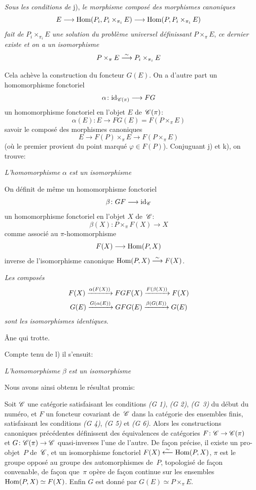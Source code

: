 \begin{enumerateb}
\item[k)] \emph{Sous les conditions de} j), \emph{le morphisme
composé des morphismes canoniques}
$$
E \to \Hom(P_i,P_i \times_{\pi_i} E) \to \Hom(P,P_i \times_{\pi_i} E)
$$
\emph{fait de} $P_i \times_{\pi_i} E$ \emph{une solution du
problème universel définissant} $P \times_{\pi} E$,
\ie \emph{ce dernier existe et on a un isomorphisme}
$$
P \times_{\pi} E \overset{\sim}{\longrightarrow} P_i \times_{\pi_i} E
$$

Cela ach\`eve la construction du foncteur $G(E)$. On a d'autre part
un homomorphisme fonctoriel
$$
\alpha \colon \id_{\cal{C}(\pi)} \to FG
$$
\ie un homomorphisme fonctoriel en l'objet $E$ de~$\cal{C}(\pi)$:
$$
\alpha(E) \colon E \to FG(E) = F(P \times_{\pi} E)
$$
savoir le compos\'e des morphismes canoniques
$$
E \to F(P) \times_{\pi} E \to F(P \times_{\pi} E)
$$
(o\`u le premier provient du point marqu\'e $\varphi \in F(P)$).
Conjuguant j) et k), on trouve:

\item[l)] \emph{L'homomorphisme} $\alpha$ \emph{est un isomorphisme}

On d\'efinit de m\^eme un homomorphisme fonctoriel
$$
\beta \colon GF \to \id_{\cal{C}}
$$
\ie un homomorphisme fonctoriel en l'objet $X$ de~$\cal{C}$:
$$
\beta(X) \colon P \times_{\pi} F(X) \to X
$$
comme
associ\'e au $\pi$-homomorphisme
$$
F(X) \to \Hom(P,X)
$$
inverse de l'isomorphisme canonique $\operatorname{Hom}(P,X) \overset{\sim}{\longrightarrow} F(X)$.

\item[m)] \emph{Les composés}
\begin{gather*}
F(X) \xrightarrow{\alpha(F(X))} FGF(X) \xrightarrow{F(\beta(X))} F(X)\\
G(E) \xrightarrow{G(\alpha(E))} GFG(E) \xrightarrow{\beta(G(E))} G(E)
\end{gather*}
\emph{sont les isomorphismes identiques}.

\^Ane qui trotte.

Compte tenu de l) il s'ensuit:

\item[n)] \emph{L'homomorphisme} $\beta$ \emph{est un isomorphisme}

Nous avons ainsi obtenu le r\'esultat promis:
\end{enumerateb}

\begin{theoreme}
\label{V.4.1}
Soit $\cal{C}$ une cat\'egorie satisfaisant les conditions \emph{(G
1)}, \emph{(G 2)}, \emph{(G~3)} du d\'ebut du num\'ero, et $F$ un
foncteur covariant de~$\cal{C}$ dans la cat\'egorie des ensembles
finis, satisfaisant les conditions \emph{(G 4)}, \emph{(G 5)} et
\emph{(G 6)}. Alors les constructions canoniques pr\'ec\'edentes
d\'efinissent des \'equivalences de cat\'egories $F\colon
\cal{C}\to \cal{C}(\pi)$ et $G\colon \cal{C}(\pi)\to \cal{C}$
quasi-inverses l'une de l'autre. De fa\c con pr\'ecise, il existe
un pro-objet~$P$ de~$\cal{C}$, et un isomorphisme fonctoriel $F(X)
\overset{\sim}{\longleftarrow} \operatorname{Hom}(P, X)$, $\pi$ est le groupe oppos\'e au groupe des
automorphismes de~$P$, topologis\'e de fa\c con convenable, de
fa\c con que~$\pi$ op\`ere de fa\c con continue sur les
ensembles $\operatorname{Hom}(P, X)\simeq F(X)$. Enfin $G$ est donn\'e par
$G(E)\simeq P\times_{\pi} E$.
\end{theoreme}


